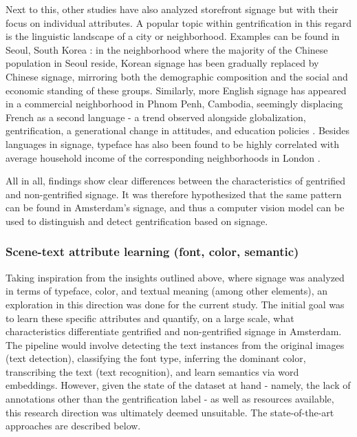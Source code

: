 Next to this, other studies have also analyzed storefront signage but with their focus on individual attributes. A popular topic within gentrification in this regard is the linguistic landscape of a city or neighborhood. Examples can be found in Seoul, South Korea \cite{hong_linguistic_2020}: in the neighborhood where the majority of the Chinese population in Seoul reside, Korean signage has been gradually replaced by Chinese signage, mirroring both the demographic composition and the social and economic standing of these groups. Similarly, more English signage has appeared in a commercial neighborhood in Phnom Penh, Cambodia, seemingly displacing French as a second language - a trend observed alongside globalization, gentrification, a generational change in attitudes, and education policies \cite{kasanga_map_2012}. Besides languages in signage, typeface has also been found to be highly correlated with average household income of the corresponding neighborhoods in London \cite{ma_typef_2019}.

All in all, findings show clear differences between the characteristics of gentrified and non-gentrified signage. It was therefore hypothesized that the same pattern can be found in Amsterdam's signage, and thus a computer vision model can be used to distinguish and detect gentrification based on signage.

\subsubsection{Scene-text attribute learning (font, color, semantic)}
Taking inspiration from the insights outlined above, where signage was analyzed in terms of typeface, color, and textual meaning (among other elements), an exploration in this direction was done for the current study. The initial goal was to learn these specific attributes and quantify, on a large scale, what characteristics differentiate gentrified and non-gentrified signage in Amsterdam. The pipeline would involve detecting the text instances from the original images (text detection), classifying the font type, inferring the dominant color, transcribing the text (text recognition), and learn semantics via word embeddings. However, given the state of the dataset at hand - namely, the lack of annotations other than the gentrification label - as well as resources available, this research direction was ultimately deemed unsuitable. The state-of-the-art approaches are described below.

